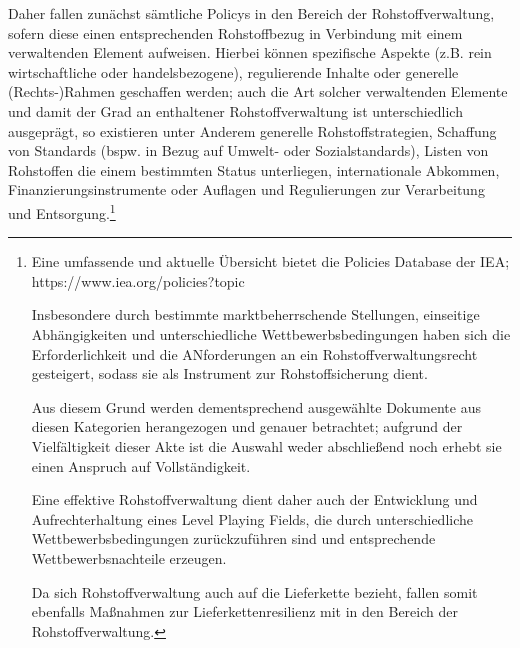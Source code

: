 \documentclass[12pt,a4paper,oneside]{book} %
\begin{document}
	Daher fallen zunächst sämtliche Policys in den Bereich der Rohstoffverwaltung, sofern diese einen entsprechenden Rohstoffbezug in Verbindung mit einem verwaltenden Element aufweisen. Hierbei können spezifische Aspekte (z.B. rein wirtschaftliche oder handelsbezogene), regulierende Inhalte oder generelle (Rechts-)Rahmen geschaffen werden; auch die Art solcher verwaltenden Elemente und damit der Grad an enthaltener Rohstoffverwaltung ist unterschiedlich ausgeprägt, so existieren unter Anderem generelle Rohstoffstrategien, Schaffung von Standards (bspw. in Bezug auf Umwelt- oder Sozialstandards), Listen von Rohstoffen die einem bestimmten Status unterliegen, internationale Abkommen, Finanzierungsinstrumente oder Auflagen und Regulierungen zur Verarbeitung und Entsorgung.\footnote{Eine umfassende und aktuelle Übersicht bietet die Policies Database der IEA; https://www.iea.org/policies?topic%
	
	Insbesondere durch bestimmte marktbeherrschende Stellungen, einseitige Abhängigkeiten und unterschiedliche Wettbewerbsbedingungen haben sich die Erforderlichkeit und die ANforderungen an ein Rohstoffverwaltungsrecht gesteigert, sodass sie als Instrument zur Rohstoffsicherung dient.
	
	Aus diesem Grund werden dementsprechend ausgewählte Dokumente aus diesen Kategorien herangezogen und genauer betrachtet; aufgrund der Vielfältigkeit dieser Akte ist die Auswahl weder abschließend noch erhebt sie einen Anspruch auf Vollständigkeit. 
	
	Eine effektive Rohstoffverwaltung dient daher auch der Entwicklung und Aufrechterhaltung eines Level Playing Fields, die durch unterschiedliche Wettbewerbsbedingungen zurückzuführen sind und entsprechende Wettbewerbsnachteile erzeugen.
	
	Da sich Rohstoffverwaltung auch auf die Lieferkette bezieht, fallen somit ebenfalls Maßnahmen zur Lieferkettenresilienz mit in den Bereich der Rohstoffverwaltung.
	
	
	
	
}
\end{document}
